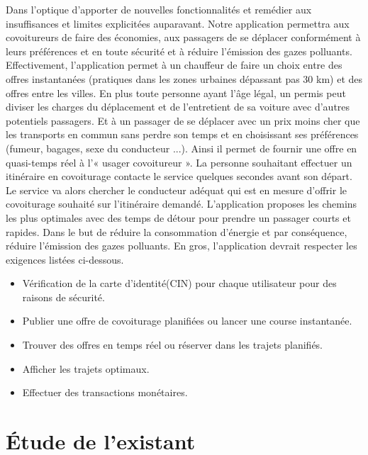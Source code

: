 Dans l'optique d'apporter de nouvelles fonctionnalités et remédier aux insuffisances et limites explicitées auparavant. Notre application permettra aux covoitureurs de faire des économies, aux passagers de se déplacer conformément à leurs préférences et en toute sécurité et à réduire l’émission des gazes polluants.\newline
Effectivement, l'application permet à un chauffeur de faire un choix entre des offres instantanées (pratiques dans les zones urbaines dépassant pas 30 km) et des offres entre les villes. En plus toute personne ayant l'âge légal, un permis peut diviser les charges du déplacement et de l'entretient de sa voiture avec d'autres potentiels passagers. Et à un passager de se déplacer avec un prix moins cher que les transports en commun sans perdre son temps et en choisissant ses préférences (fumeur, bagages, sexe du conducteur ...). Ainsi il permet de fournir une offre en quasi-temps réel à l'« usager covoitureur ». La personne souhaitant effectuer un itinéraire en covoiturage contacte le service quelques secondes avant son départ. Le service va alors chercher le conducteur adéquat qui est en mesure d'offrir le covoiturage souhaité sur l'itinéraire demandé.\newline
L'application proposes les chemins les plus optimales avec des temps de détour pour prendre un passager courts et rapides. Dans le but de réduire la consommation d’énergie et par conséquence, réduire l’émission des gazes polluants.
En gros, l'application devrait respecter les exigences listées ci-dessous.
\begin{itemize}
	\item Vérification de la carte d'identité(CIN) pour chaque utilisateur pour des raisons de sécurité.
	\item Publier une offre de covoiturage planifiées ou lancer une course instantanée.
	\item Trouver des offres en temps réel ou réserver dans les trajets planifiés.
	\item Afficher les trajets optimaux.
	\item Effectuer des transactions monétaires.
\end{itemize}

\section{Étude de l'existant}

